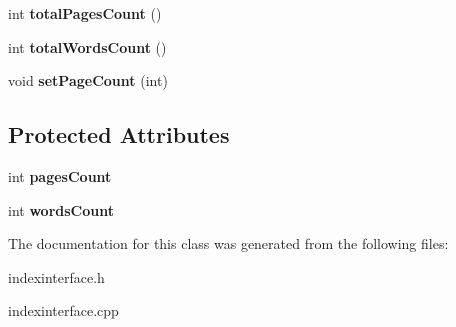 \begin{DoxyCompactItemize}
\item 
int {\bfseries total\+Pages\+Count} ()\hypertarget{classIndexInterface_a2755cd9119c0516c3c8f3e94d577cf62}{}\label{classIndexInterface_a2755cd9119c0516c3c8f3e94d577cf62}

\item 
int {\bfseries total\+Words\+Count} ()\hypertarget{classIndexInterface_a8bea7e7f4dc153986b4adf661a018f42}{}\label{classIndexInterface_a8bea7e7f4dc153986b4adf661a018f42}

\item 
void {\bfseries set\+Page\+Count} (int)\hypertarget{classIndexInterface_a52d63bd1a4963be9023256d79614568b}{}\label{classIndexInterface_a52d63bd1a4963be9023256d79614568b}

\end{DoxyCompactItemize}
\subsection*{Protected Attributes}
\begin{DoxyCompactItemize}
\item 
int {\bfseries pages\+Count}\hypertarget{classIndexInterface_aa1acece2d08df9c9149617348bf193fd}{}\label{classIndexInterface_aa1acece2d08df9c9149617348bf193fd}

\item 
int {\bfseries words\+Count}\hypertarget{classIndexInterface_a5711e2947e1aec081a55e42aec1b2d45}{}\label{classIndexInterface_a5711e2947e1aec081a55e42aec1b2d45}

\end{DoxyCompactItemize}


The documentation for this class was generated from the following files\+:\begin{DoxyCompactItemize}
\item 
indexinterface.\+h\item 
indexinterface.\+cpp\end{DoxyCompactItemize}
